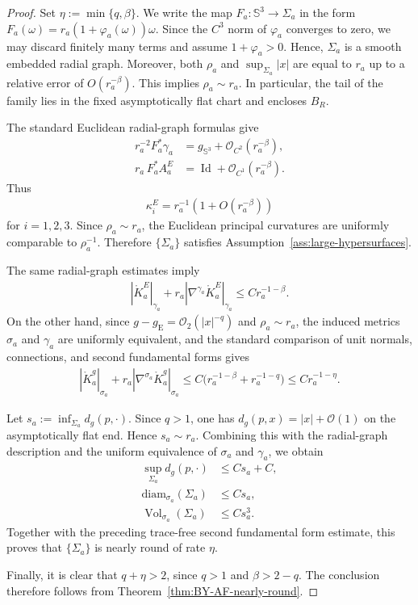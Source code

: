 \documentclass[10pt,a4paper]{amsart}
\newcommand{\Sph}{\mathbb{S}}
\newcommand{\gE}{g_{\mathrm{E}}}
\newcommand{\Vol}{\operatorname{Vol}}
\newcommand{\Id}{\operatorname{Id}}
\newcommand{\diam}{\mathrm{diam}}
\begin{document}
	\begin{proof}
		Set $\eta := \min\{q, \beta\}$. We write the map $F_a:\Sph^3 \to \Sigma_a$ in the form $F_a(\omega) = r_a(1 + \varphi_a(\omega))\omega$. Since the $C^3$ norm of $\varphi_a$ converges to zero, we may discard finitely many terms and assume $1 + \varphi_a > 0$. Hence, $\Sigma_a$ is a smooth embedded radial graph. Moreover, both $\rho_a$ and $\sup_{\Sigma_a} |x|$ are equal to $r_a$ up to a relative error of $O(r_a^{-\beta})$. This implies $\rho_a \sim r_a$. In particular, the tail of the family lies in the fixed asymptotically flat chart and encloses $B_R$.
		
		The standard Euclidean radial-graph formulas give
		\begin{align*}
			r_a^{-2}F_a^*\gamma_a
			&=
			g_{\Sph^3}+\mathcal O_{C^2}(r_a^{-\beta}),\\
			r_a\,F_a^*A_a^E
			&=
			\Id+\mathcal O_{C^1}(r_a^{-\beta}).
		\end{align*}
		Thus
		\begin{align*}
			\kappa_i^E=r_a^{-1}(1+O(r_a^{-\beta}))
		\end{align*}
		for $i=1,2,3$. Since
		$\rho_a\sim r_a$, the Euclidean principal curvatures are uniformly comparable to
		$\rho_a^{-1}$. Therefore $\{\Sigma_a\}$ satisfies
		Assumption~\ref{ass:large-hypersurfaces}.
		
		The same radial-graph estimates imply
		\begin{align*}
			\left|\mathring K_a^E\right|_{\gamma_a}
			+
			r_a\left|\nabla^{\gamma_a}\mathring K_a^E\right|_{\gamma_a}
			\le
			Cr_a^{-1-\beta}.
		\end{align*}
		On the other hand, since $g-\gE=\mathcal O_2(|x|^{-q})$ and $\rho_a\sim r_a$, the induced
		metrics $\sigma_a$ and $\gamma_a$ are uniformly equivalent, and the standard comparison
		of unit normals, connections, and second fundamental forms gives
		\begin{align*}
			\left|\mathring K_a^g\right|_{\sigma_a}
			+
			r_a\left|\nabla^{\sigma_a}\mathring K_a^g\right|_{\sigma_a}
			\le
			C\bigl(r_a^{-1-\beta}+r_a^{-1-q}\bigr)
			\le
			Cr_a^{-1-\eta}.
		\end{align*}
		
		Let $s_a:=\inf_{\Sigma_a}d_g(p,\cdot)$. Since $q>1$, one has
		$d_g(p,x)=|x|+\mathcal O(1)$ on the asymptotically flat end. Hence $s_a\sim r_a$. Combining this
		with the radial-graph description and the uniform equivalence of $\sigma_a$ and $\gamma_a$,
		we obtain
		\begin{align*}
			\sup_{\Sigma_a}d_g(p,\cdot)
			&\le
			Cs_a+C,\\
			\diam_{\sigma_a}(\Sigma_a)
			&\le
			Cs_a,\\
			\Vol_{\sigma_a}(\Sigma_a)
			&\le
			Cs_a^3.
		\end{align*}
		Together with the preceding trace-free second fundamental form estimate, this proves that
		$\{\Sigma_a\}$ is nearly round of rate $\eta$.
		
		Finally, it is clear that $q+\eta>2$, since $q>1$ and $\beta>2-q$. The conclusion therefore follows from
		Theorem~\ref{thm:BY-AF-nearly-round}.
	\end{proof}
	
\end{document}
